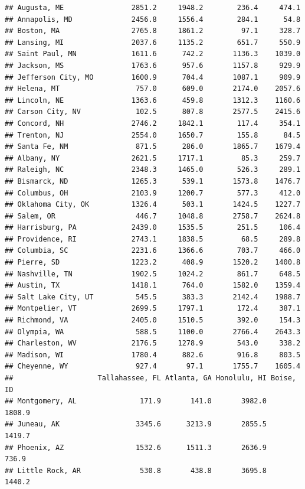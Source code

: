 \documentclass[
]{article}
\begin{document}
\begin{verbatim}
## Augusta, ME                2851.2     1948.2        236.4     474.1
## Annapolis, MD              2456.8     1556.4        284.1      54.8
## Boston, MA                 2765.8     1861.2         97.1     328.7
## Lansing, MI                2037.6     1135.2        651.7     550.9
## Saint Paul, MN             1611.6      742.2       1136.3    1039.0
## Jackson, MS                1763.6      957.6       1157.8     929.9
## Jefferson City, MO         1600.9      704.4       1087.1     909.9
## Helena, MT                  757.0      609.0       2174.0    2057.6
## Lincoln, NE                1363.6      459.8       1312.3    1160.6
## Carson City, NV             102.5      807.8       2577.5    2415.6
## Concord, NH                2746.2     1842.1        117.4     354.1
## Trenton, NJ                2554.0     1650.7        155.8      84.5
## Santa Fe, NM                871.5      286.0       1865.7    1679.4
## Albany, NY                 2621.5     1717.1         85.3     259.7
## Raleigh, NC                2348.3     1465.0        526.3     289.1
## Bismarck, ND               1265.3      539.1       1573.8    1476.7
## Columbus, OH               2103.9     1200.7        577.3     412.0
## Oklahoma City, OK          1326.4      503.1       1424.5    1227.7
## Salem, OR                   446.7     1048.8       2758.7    2624.8
## Harrisburg, PA             2439.0     1535.5        251.5     106.4
## Providence, RI             2743.1     1838.5         68.5     289.8
## Columbia, SC               2231.6     1366.6        703.7     466.0
## Pierre, SD                 1223.2      408.9       1520.2    1400.8
## Nashville, TN              1902.5     1024.2        861.7     648.5
## Austin, TX                 1418.1      764.0       1582.0    1359.4
## Salt Lake City, UT          545.5      383.3       2142.4    1988.7
## Montpelier, VT             2699.5     1797.1        172.4     387.1
## Richmond, VA               2405.0     1510.5        392.0     154.3
## Olympia, WA                 588.5     1100.0       2766.4    2643.3
## Charleston, WV             2176.5     1278.9        543.0     338.2
## Madison, WI                1780.4      882.6        916.8     803.5
## Cheyenne, WY                927.4       97.1       1755.7    1605.4
##                    Tallahassee, FL Atlanta, GA Honolulu, HI Boise, ID
## Montgomery, AL               171.9       141.0       3982.0    1808.9
## Juneau, AK                  3345.6      3213.9       2855.5    1419.7
## Phoenix, AZ                 1532.6      1511.3       2636.9     736.9
## Little Rock, AR              530.8       438.8       3695.8    1440.2

\end{verbatim}
\end{document}
